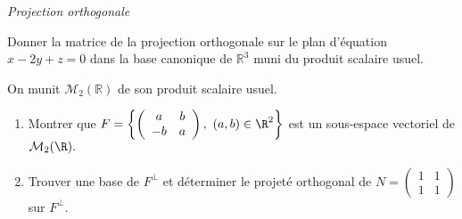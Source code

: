 \documentclass[a4paper,10pt]{report}
\begin{document}
\medskip

\begin{center}
\textit{{ {\large Projection orthogonale}}}
\end{center}

\medskip

\begin{Exa} Donner la matrice de la projection orthogonale sur le plan d'équation $x-2y+z=0$ dans la base canonique de $\mathbb{R}^3$ muni du produit scalaire usuel.
\end{Exa}

%
%

 \begin{Exa} On munit $\mathcal{M}_2(\mathbb{R})$ de son produit scalaire usuel.
\begin{enumerate}
\item Montrer que $F=\left\{\left(\begin{array}{cc} a & b\\ -b & a \end{array}\right),\ (a,b)\in\R^2\right
\}$ est un sous-espace vectoriel de ${\cal M}_2(\R).$
\item Trouver une base de $F^{\perp}$ et d\'eterminer le projet\'e orthogonal de $N=\left(\begin{array}{cc} 1&1\\ 1&1 \end{array}\right)$ sur $F^{\perp}$.
\end{enumerate}
\end{Exa}
\end{document}
